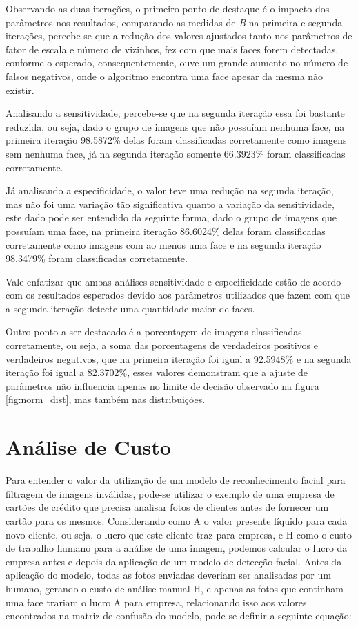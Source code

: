 Observando as duas iterações, o primeiro ponto de destaque é o impacto dos parâmetros nos resultados, comparando as medidas de \textit{B} na primeira e segunda iterações, percebe-se que a redução dos valores ajustados tanto nos parâmetros de fator de escala e número de vizinhos, fez com que mais faces forem detectadas, conforme o esperado, consequentemente, ouve um grande aumento no número de falsos negativos, onde o algoritmo encontra uma face apesar da mesma não existir. 

Analisando a sensitividade, percebe-se que na segunda iteração essa foi bastante reduzida, ou seja, dado o grupo de imagens que não possuíam nenhuma face, na primeira iteração 98.5872\% delas foram classificadas corretamente como imagens sem nenhuma face, já na segunda iteração somente 66.3923\% foram classificadas corretamente.

Já analisando a especificidade, o valor teve uma redução na segunda iteração, mas não foi uma variação tão significativa quanto a variação da sensitividade, este dado pode ser entendido da seguinte forma, dado o grupo de imagens que possuíam uma face, na primeira iteração 86.6024\% delas foram classificadas corretamente como imagens com ao menos uma face e na segunda iteração 98.3479\% foram classificadas corretamente.

Vale enfatizar que ambas análises sensitividade e especificidade estão de acordo com os resultados esperados devido aos parâmetros utilizados que fazem com que a segunda iteração detecte uma quantidade maior de faces.

Outro ponto a ser destacado é a porcentagem de imagens classificadas corretamente, ou seja, a soma das porcentagens de verdadeiros positivos e verdadeiros negativos, que na primeira iteração foi igual a 92.5948\% e na segunda iteração foi igual a 82.3702\%, esses valores demonstram que a ajuste de parâmetros não influencia apenas no limite de decisão observado na figura \ref{fig:norm_dist}, mas também nas distribuições.

\section{Análise de Custo}

Para entender o valor da utilização de um modelo de reconhecimento facial para filtragem de imagens inválidas, pode-se utilizar o exemplo de uma empresa de cartões de crédito que precisa analisar fotos de clientes antes de fornecer um cartão para os mesmos. Considerando como A o valor presente líquido para cada novo cliente, ou seja, o lucro que este cliente traz para empresa, e H como o custo de trabalho humano para a análise de uma imagem, podemos calcular o lucro da empresa antes e depois da aplicação de um modelo de detecção facial.
Antes da aplicação do modelo, todas as fotos enviadas deveriam ser analisadas por um humano, gerando o custo de análise manual H, e apenas as fotos que continham uma face trariam o lucro A para empresa, relacionando isso aos valores encontrados na matriz de confusão do modelo, pode-se definir a seguinte equação:

